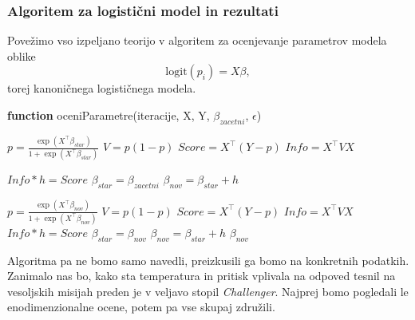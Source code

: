 \documentclass[12pt,a4paper]{amsart}
\theoremstyle{definition} %
\theoremstyle{plain} %
\begin{document}
\subsubsection{Algoritem za logistični model in rezultati}
Povežimo vso izpeljano teorijo v algoritem za ocenjevanje parametrov modela oblike
\[
    \mathrm{logit}(p_{i}) = X\beta,
\]
torej kanoničnega logističnega modela.
\begin{algorithm}[H]
    \caption{\textbf{function} oceniParametre(iteracije, X, Y, $\beta_{zacetni}$, $\epsilon$)}
\begin{algorithmic}
    
    \STATE $p = \frac{\exp{(X^\top \beta_{star})}}{1 + \exp{(X^\top \beta_{star})}}$
    \STATE $V = p(1 - p)$ 
    \STATE $Score = X^\top (Y - p)$ 
    \STATE $Info = X^\top V X$ 
    
    \STATE {} $Info * h = Score$
    \STATE $\beta_{star} = \beta_{zacetni}$
    \STATE $\beta_{nov} = \beta_{star} + h$
        
            \STATE $p = \frac{\exp{(X^\top \beta_{nov})}}{1 + \exp{(X^\top \beta_{nov})}}$ 
            \STATE $V = p(1 - p)$ 
            \STATE $Score = X^\top (Y - p)$ 
            \STATE $Info = X^\top V X$ 
            \STATE {}
            \STATE $Info * h = Score$ 
            \STATE $\beta_{star} = \beta_{nov}$ 
            \STATE $\beta_{nov} = \beta_{star} + h$ 
        \ELSE
        \STATE {}
        \RETURN $\beta_{nov}$
        \ENDIF
        
    \ENDWHILE
\end{algorithmic}
\end{algorithm}

Algoritma pa ne bomo samo navedli, preizkusili ga bomo na konkretnih podatkih. Zanimalo nas bo, kako sta temperatura in pritisk vplivala na odpoved
tesnil na vesoljskih misijah preden je v veljavo stopil \textit{Challenger}. Najprej bomo pogledali le enodimenzionalne ocene, potem pa vse skupaj združili.
\end{document}
